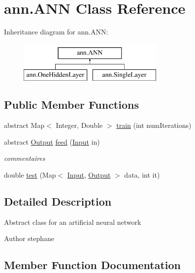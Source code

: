 \hypertarget{classann_1_1_a_n_n}{}\section{ann.\+A\+NN Class Reference}
\label{classann_1_1_a_n_n}
Inheritance diagram for ann.\+A\+NN\+:\begin{figure}[H]
\begin{center}
\leavevmode
\includegraphics[height=2.000000cm]{classann_1_1_a_n_n}
\end{center}
\end{figure}
\subsection*{Public Member Functions}
\begin{DoxyCompactItemize}
\item 
abstract Map$<$ Integer, Double $>$ \hyperlink{classann_1_1_a_n_n_a9e4c633b9b365c89245bbb441c86d71c}{train} (int num\+Iterations)
\item 
abstract \hyperlink{classann_1_1_output}{Output} \hyperlink{classann_1_1_a_n_n_adc3da5c04b719a2d7c93ef5af2e898b7}{feed} (\hyperlink{classann_1_1_input}{Input} in)
\begin{DoxyCompactList}\small\item\em commentaires \end{DoxyCompactList}\item 
double \hyperlink{classann_1_1_a_n_n_aa7ab72312b84e639aa84b6fbee5c9df1}{test} (Map$<$ \hyperlink{classann_1_1_input}{Input}, \hyperlink{classann_1_1_output}{Output} $>$ data, int it)
\end{DoxyCompactItemize}


\subsection{Detailed Description}
Abstract class for an artificial neural network \begin{DoxyAuthor}{Author}
stephane 
\end{DoxyAuthor}


\subsection{Member Function Documentation}
\mbox{\label{classann_1_1_a_n_n_adc3da5c04b719a2d7c93ef5af2e898b7}} 
